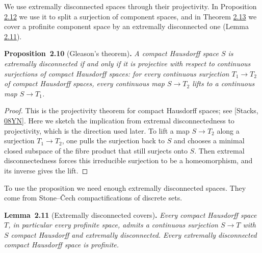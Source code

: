 \documentclass[11pt]{article}
\newenvironment{bpstatement}[2]{\par\addvspace{0.6\baselineskip}\noindent\textbf{#1}#2\textbf{.}\enspace\ignorespaces}
  {\par\addvspace{0.4\baselineskip}}
\newenvironment{bpstatementit}[2]{\begin{bpstatement}{#1}{#2}\itshape\ignorespaces}{\end{bpstatement}}
\begin{document}
We use extremally disconnected spaces through their projectivity. In Proposition \hyperref[bp36]{2.12} we use it to split a surjection of component spaces, and in Theorem \hyperref[bp39]{2.13} we cover a profinite component space by an extremally disconnected one (Lemma \hyperref[bp33]{2.11}).

\label{bp30}%
\begin{bpstatementit}{Proposition~2.10}{ (Gleason's theorem)}
A compact Hausdorff space \(S\) is extremally disconnected if and only if it is projective with respect to continuous surjections of compact Hausdorff spaces: for every continuous surjection \(T_1\to T_2\) of compact Hausdorff spaces, every continuous map \(S\to T_2\) lifts to a continuous map \(S\to T_1\).
\end{bpstatementit}

\begin{proof}[{Proof}]\label{bp31}%
This is the projectivity theorem for compact Hausdorff spaces; see [Stacks, \href{https://stacks.math.columbia.edu/tag/08YN}{08YN}]. Here we sketch the implication from extremal disconnectedness to projectivity, which is the direction used later. To lift a map \(S\to T_2\) along a surjection \(T_1\to T_2\), one pulls the surjection back to \(S\) and chooses a minimal closed subspace of the fibre product that still surjects onto \(S\). Then extremal disconnectedness forces this irreducible surjection to be a homeomorphism, and its inverse gives the lift.
\end{proof}

\label{bp32}%
To use the proposition we need enough extremally disconnected spaces. They come from Stone–Čech compactifications of discrete sets.

\label{bp33}%
\begin{bpstatementit}{Lemma~2.11}{ (Extremally disconnected covers)}
Every compact Hausdorff space \(T\), in particular every profinite space, admits a continuous surjection \(S\to T\) with \(S\) compact Hausdorff and extremally disconnected. Every extremally disconnected compact Hausdorff space is profinite.
\end{bpstatementit}
\end{document}

